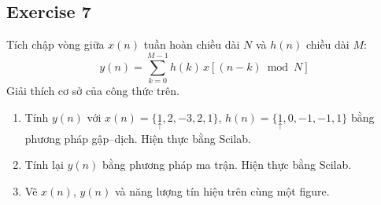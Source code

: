 \subsection{Exercise 7}
Tích chập vòng giữa $x(n)$ tuần hoàn chiều dài $N$ và $h(n)$ chiều dài $M$:
\[
y(n) = \sum_{k=0}^{M-1} h(k)\,x[(n-k) \bmod N]
\]
Giải thích cơ sở của công thức trên.
\begin{enumerate}
    \item Tính $y(n)$ với $x(n) = \{\underset{\uparrow}{1}, 2, -3, 2, 1\}$, $h(n) = \{\underset{\uparrow}{1}, 0, -1, -1, 1\}$ bằng phương pháp gập--dịch. Hiện thực bằng Scilab.
    \item Tính lại $y(n)$ bằng phương pháp ma trận. Hiện thực bằng Scilab.
    \item Vẽ $x(n)$, $y(n)$ và năng lượng tín hiệu trên cùng một figure.
\end{enumerate}



